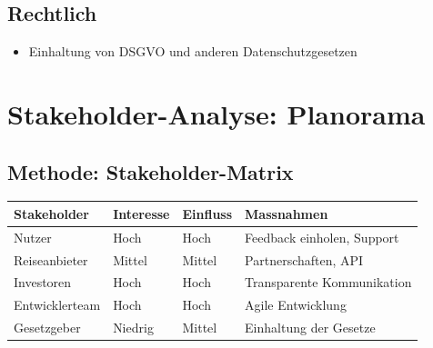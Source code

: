 \documentclass{article}
\begin{document}
\subsection{Rechtlich}\label{rechtlich}

\begin{itemize}
\tightlist
\item
  Einhaltung von DSGVO und anderen Datenschutzgesetzen
\end{itemize}

\newpage

\section{Stakeholder-Analyse:
Planorama}\label{stakeholder-analyse-planorama}

\subsection{Methode:
Stakeholder-Matrix}\label{methode-stakeholder-matrix}

\begin{longtable}[]{@{}
  >{\raggedright\arraybackslash}p{}
  >{\raggedright\arraybackslash}p{}
  >{\raggedright\arraybackslash}p{}
  >{\raggedright\arraybackslash}p{}@{}}
\toprule\noalign{}
\begin{minipage}[b]{\linewidth}\raggedright
Stakeholder
\end{minipage} & \begin{minipage}[b]{\linewidth}\raggedright
Interesse
\end{minipage} & \begin{minipage}[b]{\linewidth}\raggedright
Einfluss
\end{minipage} & \begin{minipage}[b]{\linewidth}\raggedright
Massnahmen
\end{minipage} \\
\midrule\noalign{}
\endhead
\bottomrule\noalign{}
\endlastfoot
Nutzer & Hoch & Hoch & Feedback einholen, Support \\
Reiseanbieter & Mittel & Mittel & Partnerschaften, API \\
Investoren & Hoch & Hoch & Transparente Kommunikation \\
Entwicklerteam & Hoch & Hoch & Agile Entwicklung \\
Gesetzgeber & Niedrig & Mittel & Einhaltung der Gesetze \\
\end{longtable}
\end{document}
